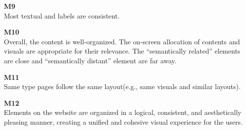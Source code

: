 \begin{description}
\item {\textbf{M9} \color{unicefGray}{Interaction placeholder consistency}}\\
Most textual and labels are consistent.

\item {\textbf{M10} \color{unicefGray}{Spatial allocation}}\\
Overall, the content is well-organized. The on-screen allocation of contents and visuals are appropriate for their relevance. The “semantically related” elements are close and “semantically distant” element are far away.

\item {\textbf{M11} \color{unicefGray}{Consistency of the page structure}}\\
Same type pages follow the same layout(e.g., same visuals and similar layouts).

\item {\textbf{M12} \color{unicefGray}{Coherence in page layout}}\\
Elements on the website are organized in a logical, consistent, and aesthetically pleasing manner, creating a unified and cohesive visual experience for the users.
\end{description}
 	 




